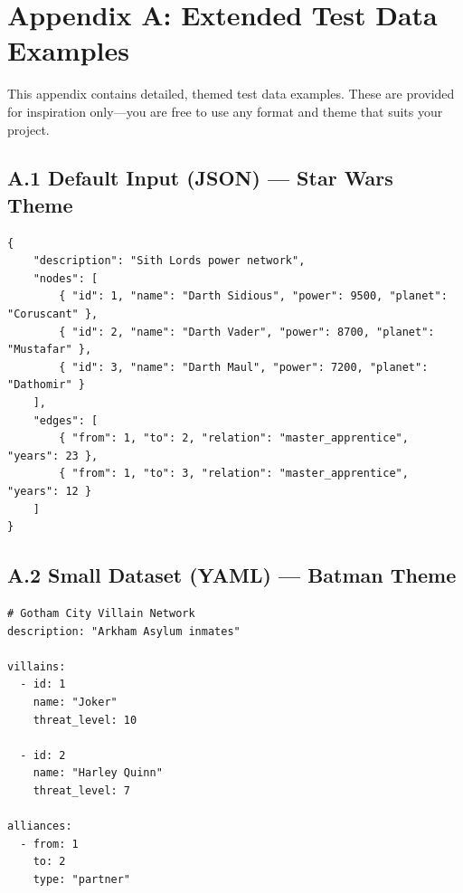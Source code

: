 
\section*{Appendix A: Extended Test Data Examples}

This appendix contains detailed, themed test data examples. These are provided for inspiration only---you are free to use any format and theme that suits your project.

\subsection*{A.1 Default Input (JSON) --- Star Wars Theme}

\begin{lstlisting}[style=json, caption={data/input\_default.json}]
{
    "description": "Sith Lords power network",
    "nodes": [
        { "id": 1, "name": "Darth Sidious", "power": 9500, "planet": "Coruscant" },
        { "id": 2, "name": "Darth Vader", "power": 8700, "planet": "Mustafar" },
        { "id": 3, "name": "Darth Maul", "power": 7200, "planet": "Dathomir" }
    ],
    "edges": [
        { "from": 1, "to": 2, "relation": "master_apprentice", "years": 23 },
        { "from": 1, "to": 3, "relation": "master_apprentice", "years": 12 }
    ]
}
\end{lstlisting}

\subsection*{A.2 Small Dataset (YAML) --- Batman Theme}

\begin{lstlisting}[style=yaml, caption={data/input\_small.yaml}]
# Gotham City Villain Network
description: "Arkham Asylum inmates"

villains:
  - id: 1
    name: "Joker"
    threat_level: 10

  - id: 2
    name: "Harley Quinn"
    threat_level: 7

alliances:
  - from: 1
    to: 2
    type: "partner"
\end{lstlisting}

